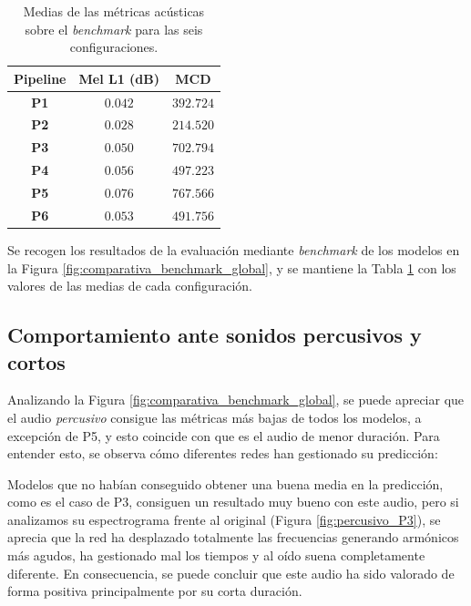 \begin{table}[H]
    \centering
    \small
    \begin{tabular}{|c||c|c|}
    \hline
    \textbf{Pipeline} & \textbf{Mel L1 (dB)} & \textbf{MCD} \\ \hline\hline
    \textbf{P1} & $0.042$ & $392.724$ \\ \hline
    \textbf{P2} & $0.028$ & $214.520$ \\ \hline
    \textbf{P3} & $0.050$ & $702.794$ \\ \hline
    \textbf{P4} & $0.056$ & $497.223$ \\ \hline
    \textbf{P5} & $0.076$ & $767.566$ \\ \hline
    \textbf{P6} & $0.053$ & $491.756$ \\ \hline
    \end{tabular}
    \caption{Medias de las métricas acústicas sobre el \textit{benchmark} para las seis configuraciones.}
    \label{tab:metricas_exactas_benchmark}
\end{table}

Se recogen los resultados de la evaluación mediante \textit{benchmark} de los modelos en la Figura \ref{fig:comparativa_benchmark_global}, y se mantiene la Tabla \ref{tab:metricas_exactas_benchmark} con los valores de las medias de cada configuración.

\subsection{Comportamiento ante sonidos percusivos y cortos}
\label{sec:sonidosPercusivos}

Analizando la Figura \ref{fig:comparativa_benchmark_global}, se puede apreciar que el audio \textit{percusivo} consigue las métricas más bajas de todos los modelos, a excepción de P5, y esto coincide con que es el audio de menor duración. Para entender esto, se observa cómo diferentes redes han gestionado su predicción:

Modelos que no habían conseguido obtener una buena media en la predicción, como es el caso de P3, consiguen un resultado muy bueno con este audio, pero si analizamos su espectrograma frente al original (Figura \ref{fig:percusivo_P3}), se aprecia que la red ha desplazado totalmente las frecuencias generando armónicos más agudos, ha gestionado mal los tiempos y al oído suena completamente diferente. En consecuencia, se puede concluir que este audio ha sido valorado de forma positiva principalmente por su corta duración. 

